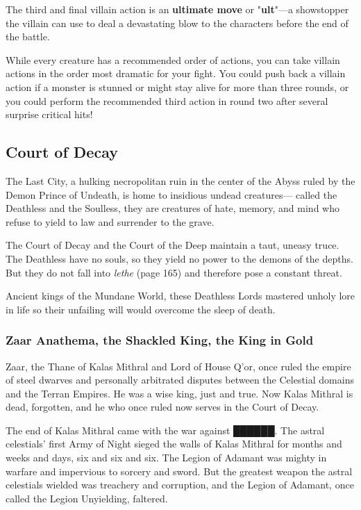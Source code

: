 \documentclass[10pt,a4paper,twoside,bg=print,twocolumn,openany,nodeprecatedcode]{dndbook}
\begin{document}
The third and final villain action is an \textbf{ultimate move} or "\textbf{ult}"—a showstopper the villain can use to deal a devastating blow to the characters before the end of the battle.

While every creature has a recommended order of actions, you can take villain actions in the order most dramatic for your fight. You could push back a villain action if a monster is stunned or might stay alive for more than three rounds, or you could perform the recommended third action in round two after several surprise critical hits!

\subsection{Court of Decay}
The Last City, a hulking necropolitan ruin in the center of the Abyss ruled by the Demon Prince of Undeath, is home to insidious undead creatures— called the Deathless and the Soulless, they are creatures of hate, memory, and mind who refuse to yield to law and surrender to the grave.

The Court of Decay and the Court of the Deep maintain a taut, uneasy truce. The Deathless have no souls, so they yield no power to the demons of the depths. But they do not fall into \textit{lethe} (page 165) and therefore pose a constant threat.

Ancient kings of the Mundane World, these Deathless Lords mastered unholy lore in life so their unfailing will would overcome the sleep of death.

\subsubsection{Zaar Anathema, the Shackled King, the King in Gold}
Zaar, the Thane of Kalas Mithral and Lord of House Q'or, once ruled the empire of steel dwarves and personally arbitrated disputes between the Celestial domains and the Terran Empires. He was a wise king, just and true. Now Kalas Mithral is dead, forgotten, and he who once ruled now serves in the Court of Decay.

The end of Kalas Mithral came with the war against ██████. The astral celestials' first Army of Night sieged the walls of Kalas Mithral for months and weeks and days, six and six and six. The Legion of Adamant was mighty in warfare and impervious to sorcery and sword. But the greatest weapon the astral celestials wielded was treachery and corruption, and the Legion of Adamant, once called the Legion Unyielding, faltered.
\end{document}
